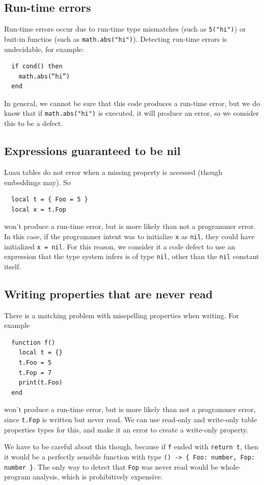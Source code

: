 \documentclass[sigplan]{acmart}
\begin{document}
\subsection{Run-time errors}

Run-time errors occur due to run-time type mismatches (such as \verb|5("hi")|)
or buit-in functios (such as \verb|math.abs("hi")|).
Detecting run-time errors is undecidable, for example:
\begin{verbatim}
  if cond() then
    math.abs(“hi”)
  end
\end{verbatim}
In general, we cannot be sure that this code produces a run-time
error, but we do know that if \verb|math.abs("hi")| is executed, it
will produce an error, so we consider this to be a defect.

\subsection{Expressions guaranteed to be nil}

Luau tables do not error when a missing property is accessed (though embeddings may). So
\begin{verbatim}
  local t = { Foo = 5 }
  local x = t.Fop
\end{verbatim}
won’t produce a run-time error, but is more likely than not a
programmer error. In this case, if the programmer intent was to
initialize \verb|x| as \verb|nil|, they could have initialized
\verb|x = nil|.  For this reason, we consider it a code defect to use
an expression that the type system infers is of type \verb|nil|, other
than the \verb|nil| constant itself.

\subsection{Writing properties that are never read}

There is a matching problem with misspelling properties when writing. For example
\begin{verbatim}
  function f()
    local t = {}
    t.Foo = 5
    t.Fop = 7
    print(t.Foo)
  end
\end{verbatim}
won’t produce a run-time error, but is more likely than not a
programmer error, since \verb|t.Fop| is written but never read. We can use
read-only and write-only table properties types for this, and make it an
error to create a write-only property.

We have to be careful about this though, because if \verb|f| ended
with \verb|return t|, then it would be a perfectly sensible function
with type \verb|() -> { Foo: number, Fop: number }|. The only way to detect
that \verb|Fop| was never read would be whole-program analysis, which is
prohibitively expensive.
\end{document}
